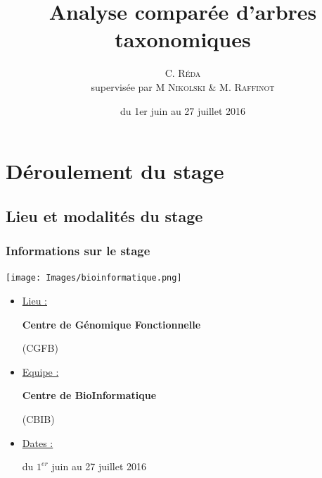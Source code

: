 \documentclass{beamer}
\title{Analyse comparée d'arbres taxonomiques}
\author{C. \textsc{Réda}\\supervisée par M \textsc{Nikolski} \& M. \textsc{Raffinot}}
\institute{CGFB, équipe CBIB, Bordeaux}
\date{du 1er juin au 27 juillet 2016}
\begin{document}
\maketitle
\tableofcontents
\setlength{\parindent}{1cm}


\section{Déroulement du stage}


\subsection{Lieu et modalités du stage}


\begin{frame}
\frametitle{Informations sur le stage}

\begin{center}

\texttt{[image: Images/bioinformatique.png]}

\begin{itemize}
\item \uline{Lieu :} 
\begin{flushcenter} \bf Centre de Génomique Fonctionnelle \end{flushcenter}
\bigskip
\begin{flushcenter} (CGFB) \end{flushcenter}
\item \uline{Equipe :} 
\begin{flushcenter} \bf Centre de BioInformatique \end{flushcenter}
\bigskip
\begin{flushcenter} (CBIB) \end{flushcenter}
\item \uline{Dates :} 
\begin{flushcenter} du $1^{er}$ juin au 27 juillet 2016 \end{flushcenter}
\end{itemize}

\end{center}


\end{frame}
\end{document}
